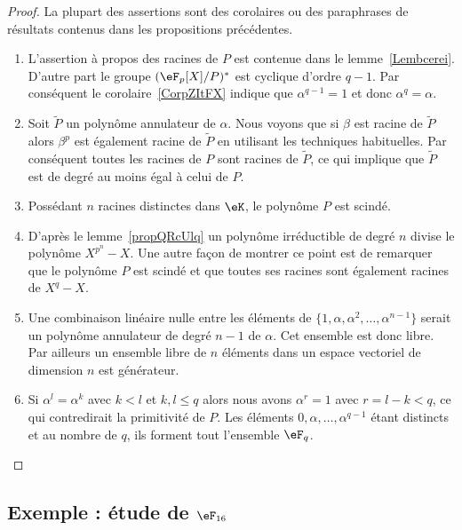 \begin{proof}
	La plupart des assertions sont des corolaires ou des paraphrases de résultats contenus dans les propositions précédentes.
	\begin{enumerate}
		\item
		      L'assertion à propos des racines de \( P\) est contenue dans le lemme~\ref{Lembcerei}. D'autre part le groupe \( (\eF_p[X]/P)^*\) est cyclique d'ordre \( q-1\). Par conséquent le corolaire~\ref{CorpZItFX} indique que \( \alpha^{q-1}=1\) et donc \( \alpha^q=\alpha\).
		\item
		      Soit \( \tilde P\) un polynôme annulateur de \( \alpha\). Nous voyons que si \( \beta\) est racine de \( \tilde P\) alors \( \beta^p\) est également racine de \( \tilde P\) en utilisant les techniques habituelles. Par conséquent toutes les racines de \( P\) sont racines de \( \tilde P\), ce qui implique que \( \tilde P\) est de degré au moins égal à celui de \( P\).
		\item
		      Possédant \( n\) racines distinctes dans \( \eK\), le polynôme \( P\) est scindé.
		\item
		      D'après le lemme~\ref{propQRcUlq} un polynôme irréductible de degré \( n\) divise le polynôme \( X^{p^n}-X\). Une autre façon de montrer ce point est de remarquer que le polynôme \( P\) est scindé et que toutes ses racines sont également racines de \( X^q-X\).
		\item
		      Une combinaison linéaire nulle entre les éléments de \( \{ 1,\alpha,\alpha^2,\ldots, \alpha^{n-1} \}\) serait un polynôme annulateur de degré \( n-1\) de \( \alpha\). Cet ensemble est donc libre. Par ailleurs un ensemble libre de \( n\) éléments dans un espace vectoriel de dimension \( n\) est générateur.
		\item
		      Si \( \alpha^l=\alpha^k\) avec \( k<l\) et \( k,l\leq q\) alors nous avons \( \alpha^r=1\) avec \( r=l-k<q\), ce qui contredirait la primitivité de \( P\). Les éléments \( 0,\alpha,\ldots, \alpha^{q-1}\) étant distincts et au nombre de \( q\), ils forment tout l'ensemble \( \eF_q\).
	\end{enumerate}
\end{proof}

\subsection{Exemple : étude de \texorpdfstring{\( \eF_{16}\)}{F16}}

